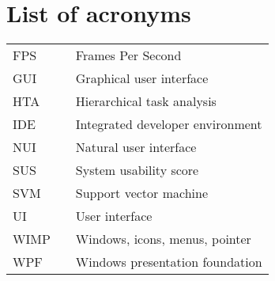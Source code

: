 \chapter*{List of acronyms}

\setlength{\LTleft}{0pt}
\begin{longtable}{lll}
FPS & \phantom{xxxxxxx} & Frames Per Second\\
GUI	& \phantom{xxxxxxx} & Graphical user interface\\
HTA	& \phantom{xxxxxxx} & Hierarchical task analysis\\
IDE & \phantom{xxxxxxx} & Integrated developer environment\\
NUI & \phantom{xxxxxxx} & Natural user interface\\
SUS & \phantom{xxxxxxx} & System usability score\\
SVM	& \phantom{xxxxxxx} & Support vector machine\\
UI  & \phantom{xxxxxxx} & User interface\\
WIMP & \phantom{xxxxxxx} & Windows, icons, menus, pointer\\
WPF & \phantom{xxxxxxx} & Windows presentation foundation
\end{longtable}